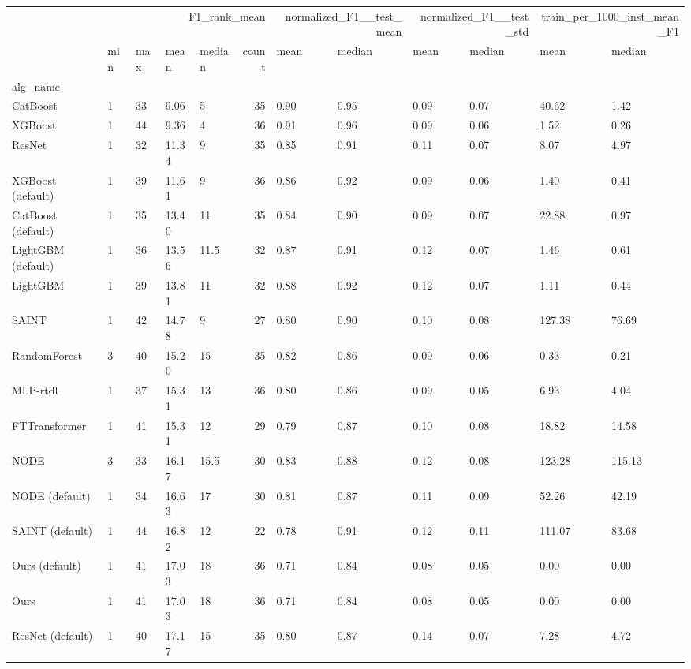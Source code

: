 \begin{tabular}{lllllrllllll}
\toprule
 & \multicolumn{5}{r}{F1_rank_mean} & \multicolumn{2}{r}{normalized_F1__test_mean} & \multicolumn{2}{r}{normalized_F1__test_std} & \multicolumn{2}{r}{train_per_1000_inst_mean_F1} \\
 & min & max & mean & median & count & mean & median & mean & median & mean & median \\
alg_name &  &  &  &  &  &  &  &  &  &  &  \\
\midrule
CatBoost & 1 & 33 & 9.06 & 5 & 35 & 0.90 & 0.95 & 0.09 & 0.07 & 40.62 & 1.42 \\
XGBoost & 1 & 44 & 9.36 & 4 & 36 & 0.91 & 0.96 & 0.09 & 0.06 & 1.52 & 0.26 \\
ResNet & 1 & 32 & 11.34 & 9 & 35 & 0.85 & 0.91 & 0.11 & 0.07 & 8.07 & 4.97 \\
XGBoost (default) & 1 & 39 & 11.61 & 9 & 36 & 0.86 & 0.92 & 0.09 & 0.06 & 1.40 & 0.41 \\
CatBoost (default) & 1 & 35 & 13.40 & 11 & 35 & 0.84 & 0.90 & 0.09 & 0.07 & 22.88 & 0.97 \\
LightGBM (default) & 1 & 36 & 13.56 & 11.5 & 32 & 0.87 & 0.91 & 0.12 & 0.07 & 1.46 & 0.61 \\
LightGBM & 1 & 39 & 13.81 & 11 & 32 & 0.88 & 0.92 & 0.12 & 0.07 & 1.11 & 0.44 \\
SAINT & 1 & 42 & 14.78 & 9 & 27 & 0.80 & 0.90 & 0.10 & 0.08 & 127.38 & 76.69 \\
RandomForest & 3 & 40 & 15.20 & 15 & 35 & 0.82 & 0.86 & 0.09 & 0.06 & 0.33 & 0.21 \\
MLP-rtdl & 1 & 37 & 15.31 & 13 & 36 & 0.80 & 0.86 & 0.09 & 0.05 & 6.93 & 4.04 \\
FTTransformer & 1 & 41 & 15.31 & 12 & 29 & 0.79 & 0.87 & 0.10 & 0.08 & 18.82 & 14.58 \\
NODE & 3 & 33 & 16.17 & 15.5 & 30 & 0.83 & 0.88 & 0.12 & 0.08 & 123.28 & 115.13 \\
NODE (default) & 1 & 34 & 16.63 & 17 & 30 & 0.81 & 0.87 & 0.11 & 0.09 & 52.26 & 42.19 \\
SAINT (default) & 1 & 44 & 16.82 & 12 & 22 & 0.78 & 0.91 & 0.12 & 0.11 & 111.07 & 83.68 \\
Ours (default) & 1 & 41 & 17.03 & 18 & 36 & 0.71 & 0.84 & 0.08 & 0.05 & 0.00 & 0.00 \\
Ours & 1 & 41 & 17.03 & 18 & 36 & 0.71 & 0.84 & 0.08 & 0.05 & 0.00 & 0.00 \\
ResNet (default) & 1 & 40 & 17.17 & 15 & 35 & 0.80 & 0.87 & 0.14 & 0.07 & 7.28 & 4.72 \\

\end{tabular}
